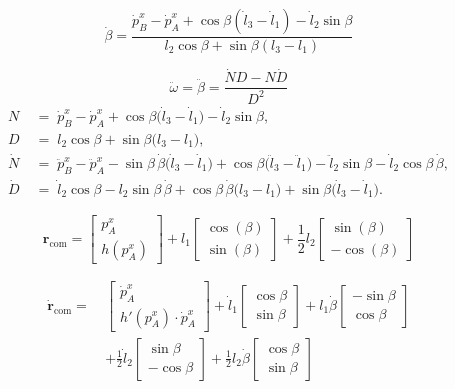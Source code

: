 \documentclass[10pt]{article}
\begin{document}
\[
\dot{\beta} = \frac{
\dot{p}_B^x - \dot{p}_A^x + \cos\beta (\dot{l}_3 - \dot{l}_1) - \dot{l}_2 \sin\beta
}{
l_2 \cos\beta + \sin\beta (l_3 - l_1)
}
\]

\vspace{1em}

\[\ddot{\omega}  = \ddot{\beta} =
\frac{
\dot{N}D
-
N\dot{D}
}{D^{2}}
\]
\begin{align}
N &\;=\;
    \dot{p}_B^{x}-\dot{p}_A^{x}
    +\cos\beta\bigl(\dot{l}_{3}-\dot{l}_{1}\bigr)
    -\dot{l}_{2}\sin\beta,
\\[4pt]
D &\;=\;
    l_{2}\cos\beta
    +\sin\beta\bigl(l_{3}-l_{1}\bigr),
\\[4pt]
\dot{N} &\;=\;
    \ddot{p}_B^{x}-\ddot{p}_A^{x}
    -\sin\beta\,\dot{\beta}\bigl(\dot{l}_{3}-\dot{l}_{1}\bigr)
    +\cos\beta\bigl(\ddot{l}_{3}-\ddot{l}_{1}\bigr)
    -\ddot{l}_{2}\sin\beta
    -\dot{l}_{2}\cos\beta\,\dot{\beta},
\\[4pt]
\dot{D} &\;=\;
    \dot{l}_{2}\cos\beta
    -l_{2}\sin\beta\,\dot{\beta}
    +\cos\beta\,\dot{\beta}\bigl(l_{3}-l_{1}\bigr)
    +\sin\beta\bigl(\dot{l}_{3}-\dot{l}_{1}\bigr).
\end{align}

\vspace{1em}

\[
\mathbf{r}_{\mathrm{com}} =
\begin{bmatrix}
p_A^x \\
h(p_A^x)
\end{bmatrix}
+
l_1
\begin{bmatrix}
\cos(\beta) \\
\sin(\beta)
\end{bmatrix}
+
\frac{1}{2} l_2
\begin{bmatrix}
\sin(\beta) \\
-\cos(\beta)
\end{bmatrix}
\]

\begin{align*}
\dot{\mathbf{r}}_{\text{com}} =\ &
\begin{bmatrix}
\dot{p}_A^x \\
h'(p_A^x) \cdot \dot{p}_A^x
\end{bmatrix}
+
\dot{l}_1
\begin{bmatrix}
\cos\beta \\
\sin\beta
\end{bmatrix}
+
l_1 \dot{\beta}
\begin{bmatrix}
-\sin\beta \\
\cos\beta
\end{bmatrix} \\
&+
\frac{1}{2} \dot{l}_2
\begin{bmatrix}
\sin\beta \\
-\cos\beta
\end{bmatrix}
+
\frac{1}{2} l_2 \dot{\beta}
\begin{bmatrix}
\cos\beta \\
\sin\beta
\end{bmatrix}
\end{align*}
\end{document}
